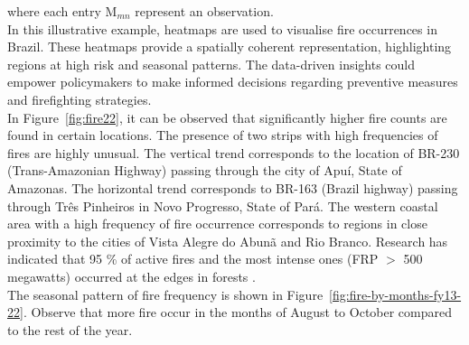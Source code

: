 \documentclass{article}\usepackage[]{graphicx}\usepackage[]{xcolor}
\numberwithin{equation}{section}
\begin{document}
\noindent
where each entry $\mathrm{M}_{mn}$ represent an observation.\\

\noindent
In this illustrative example, heatmaps are used to visualise fire occurrences in Brazil. These heatmaps provide a spatially coherent representation, highlighting regions at high risk and seasonal patterns. The data-driven insights could empower policymakers to make informed decisions regarding preventive measures and firefighting strategies.\\

\noindent
In Figure~\ref{fig:fire22}, it can be observed that significantly higher fire counts are found in certain locations. The presence of two strips with high frequencies of fires are highly unusual. The vertical trend corresponds to the location of BR-230 (Trans-Amazonian Highway) passing through the city of Apuí, State of Amazonas. The horizontal trend corresponds to BR-163 (Brazil highway) passing through Três Pinheiros in Novo Progresso, State of Pará. The western coastal area with a high frequency of fire occurrence corresponds to regions in close proximity to the cities of Vista Alegre do Abunã and Rio Branco. Research has indicated that 95 \% of active fires and the most intense ones (FRP $>$ 500 megawatts) occurred at the edges in forests \cite{forest}.\\

\noindent
The seasonal pattern of fire frequency is shown in Figure~\ref{fig:fire-by-months-fy13-22}. Observe that more fire occur in the months of August to October compared to the rest of the year.
\end{document}
